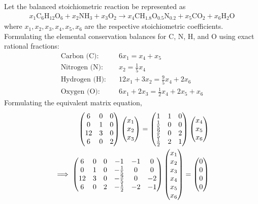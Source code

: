 \begin{enumerate}[label=\thesubsection.\arabic*, ref=\thesubsection.\theenumi,itemsep=0pt]
\solution
Let the balanced stoichiometric reaction be represented as
\begin{align}
x_1 \text{C}_6\text{H}_{12}\text{O}_6 + x_2 \text{NH}_3 + x_3 \text{O}_2 \rightarrow x_4 \text{CH}_{1.8}\text{O}_{0.5}\text{N}_{0.2} + x_5 \text{CO}_2 + x_6 \text{H}_2\text{O}
\end{align}
where $x_1, x_2, x_3, x_4, x_5, x_6$ are the respective stoichiometric coefficients.
Formulating the elemental conservation balances for $\text{C}$, $\text{N}$, $\text{H}$, and $\text{O}$ using exact rational fractions:
\begin{align}
\text{Carbon (C):} \quad & 6x_1 = x_4 + x_5 \\
\text{Nitrogen (N):} \quad & x_2 = \frac{1}{5}x_4 \\
\text{Hydrogen (H):} \quad & 12x_1 + 3x_2 = \frac{9}{5}x_4 + 2x_6 \\
\text{Oxygen (O):} \quad & 6x_1 + 2x_3 = \frac{1}{2}x_4 + 2x_5 + x_6
\end{align}
%
Formulating the equivalent matrix equation,
\begin{align}
\begin{pmatrix}
6 & 0 & 0 \\
0 & 1 & 0 \\
12 & 3 & 0 \\
6 & 0 & 2
\end{pmatrix}
\begin{pmatrix}x_1 \\ x_2 \\ x_3\end{pmatrix}
=
\begin{pmatrix}
1 & 1 & 0 \\
\frac{1}{5} & 0 & 0 \\
\frac{9}{5} & 0 & 2 \\
\frac{1}{2} & 2 & 1
\end{pmatrix}
\begin{pmatrix}x_4 \\ x_5 \\ x_6\end{pmatrix}
\\
\implies\begin{pmatrix}
6 & 0 & 0 & -1 & -1 & 0 \\
0 & 1 & 0 & -\frac{1}{5} & 0 & 0 \\
12 & 3 & 0 & -\frac{9}{5} & 0 & -2 \\
6 & 0 & 2 & -\frac{1}{2} & -2 & -1
\end{pmatrix}
\begin{pmatrix}x_1 \\ x_2 \\ x_3 \\ x_4 \\ x_5 \\ x_6\end{pmatrix}
=
\begin{pmatrix}0 \\ 0 \\ 0 \\ 0\end{pmatrix}
\end{align}

\end{enumerate}
